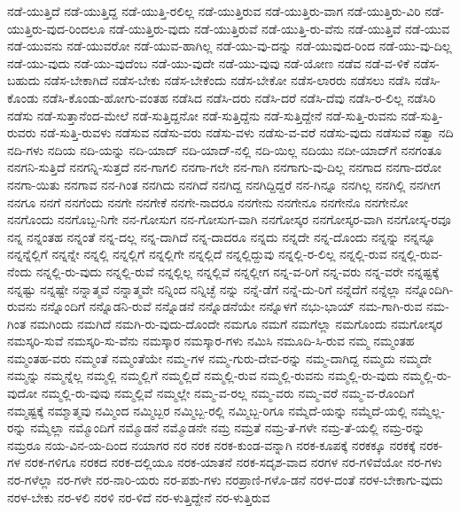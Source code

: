{ನಡೆ-ಯುತ್ತಿದೆ
ನಡೆ-ಯುತ್ತಿದ್ದ
ನಡೆ-ಯುತ್ತಿ-ರಲಿಲ್ಲ
ನಡೆ-ಯುತ್ತಿರುವ
ನಡೆ-ಯುತ್ತಿರು-ವಾಗ
ನಡೆ-ಯುತ್ತಿರು-ವಿರಿ
ನಡೆ-ಯುತ್ತಿರು-ವುದ-ರಿಂದಲೂ
ನಡೆ-ಯುತ್ತಿರು-ವುದು
ನಡೆ-ಯುತ್ತಿರುವೆ
ನಡೆ-ಯುತ್ತಿ-ರು-ವೆನು
ನಡೆ-ಯುತ್ತಿವೆ
ನಡೆ-ಯುವ
ನಡೆ-ಯುವನು
ನಡೆ-ಯುವರೋ
ನಡೆ-ಯುವ-ಹಾಗಿಲ್ಲ
ನಡೆ-ಯು-ವು-ದನ್ನು
ನಡೆ-ಯುವುದ-ರಿಂದ
ನಡೆ-ಯು-ವು-ದಿಲ್ಲ
ನಡೆ-ಯು-ವುದು
ನಡೆ-ಯು-ವುದೆಂಬ
ನಡೆ-ಯು-ವುದೇ
ನಡೆ-ಯು-ವುವು
ನಡೆ-ಯೋಣ
ನಡೆವ
ನಡೆ-ವ-ಳಿಕೆ
ನಡೆಸ-ಬಹುದು
ನಡೆಸ-ಬೇಕಾಗಿದೆ
ನಡೆಸ-ಬೇಕು
ನಡೆಸ-ಬೇಕೆಂದು
ನಡೆಸ-ಬೇಕೋ
ನಡೆಸ-ಲಾರರು
ನಡೆಸಲು
ನಡೆಸಿ
ನಡೆಸಿ-ಕೊಂಡು
ನಡೆಸಿ-ಕೊಂಡು-ಹೋಗು-ವಂತಹ
ನಡೆಸಿದ
ನಡೆಸಿ-ದರು
ನಡೆಸಿ-ದರೆ
ನಡೆಸಿ-ದೆವು
ನಡೆಸಿ-ರ-ಲಿಲ್ಲ
ನಡೆಸಿರಿ
ನಡೆಸು
ನಡೆ-ಸುತ್ತಾನೆಂದ-ಮೇಲೆ
ನಡೆ-ಸುತ್ತಿದ್ದನೋ
ನಡೆ-ಸುತ್ತಿದ್ದೆನು
ನಡೆ-ಸುತ್ತಿದ್ದೇನೆ
ನಡೆ-ಸುತ್ತಿ-ರುವನು
ನಡೆ-ಸುತ್ತಿ-ರುವರು
ನಡೆ-ಸುತ್ತಿ-ರುವಳು
ನಡೆಸುವ
ನಡೆಸು-ವರು
ನಡೆಸು-ವಳು
ನಡೆಸು-ವ-ವರೆ
ನಡೆಸು-ವುದು
ನಡೆಸುವೆ
ನತ್ವಾ
ನದಿ
ನದಿ-ಗಳು
ನದಿಯ
ನದಿ-ಯನ್ನು
ನದಿ-ಯಾದ್
ನದಿ-ಯಾದ್‌-ನಲ್ಲಿ
ನದಿ-ಯಿಲ್ಲ
ನದಿಯು
ನದೀ-ಯಾದ್‌ಗೆ
ನನಗಂತೂ
ನನಗನಿ-ಸುತ್ತಿದೆ
ನನಗನ್ನಿ-ಸುತ್ತದೆ
ನನ-ಗಾಗಲಿ
ನನಗಾ-ಗಲೇ
ನನ-ಗಾಗಿ
ನನಗಾಗು-ವು-ದಿಲ್ಲ
ನನಗಾದ
ನನಗಾ-ದರೋ
ನನಗಾ-ಯಿತು
ನನಗಾವ
ನನ-ಗಿಂತ
ನನಗಿದು
ನನಗಿದೆ
ನನಗಿದ್ದ
ನನಗಿದ್ದಿದ್ದರೆ
ನನ-ಗಿನ್ನೂ
ನನಗಿಲ್ಲ
ನನಗಿಲ್ಲಿ
ನನಗೀಗ
ನನಗೂ
ನನಗೆ
ನನಗೆಂದು
ನನಗೇ
ನನಗೇಕೆ
ನನಗೇ-ನಾದರೂ
ನನಗೇನು
ನನಗೇನೂ
ನನಗೇನೊ
ನನಗೇನೋ
ನನಗೊಂದು
ನನಗೊಬ್ಬ-ನಿಗೇ
ನನ-ಗೋಸುಗ
ನನ-ಗೋಸುಗ-ವಾಗಿ
ನನಗೋಸ್ಕರ
ನನಗೋಸ್ಕರ-ವಾಗಿ
ನನಗೋಸ್ಕ-ರವೂ
ನನ್ನ
ನನ್ನಂತಹ
ನನ್ನಂತೆ
ನನ್ನ-ದಲ್ಲ
ನನ್ನ-ದಾಗಿದೆ
ನನ್ನ-ದಾದರೂ
ನನ್ನದು
ನನ್ನದೇ
ನನ್ನ-ದೊಂದು
ನನ್ನನ್ನು
ನನ್ನನ್ನೂ
ನನ್ನನ್ನೆಲ್ಲಿಗೆ
ನನ್ನನ್ನೇ
ನನ್ನಲ್ಲಿ
ನನ್ನಲ್ಲಿಗೆ
ನನ್ನಲ್ಲಿಗೇ
ನನ್ನಲ್ಲಿದೆ
ನನ್ನಲ್ಲಿದ್ದುವು
ನನ್ನಲ್ಲಿ-ರ-ಲಿಲ್ಲ
ನನ್ನಲ್ಲಿ-ರುವ
ನನ್ನಲ್ಲಿ-ರುವ-ನೆಂದು
ನನ್ನಲ್ಲಿ-ರು-ವುದು
ನನ್ನಲ್ಲಿ-ರುವೆ
ನನ್ನಲ್ಲಿಲ್ಲ
ನನ್ನಲ್ಲಿವೆ
ನನ್ನಲ್ಲೀಗ
ನನ್ನ-ವ-ರಿಗೆ
ನನ್ನ-ವರು
ನನ್ನ-ವರೇ
ನನ್ನಷ್ಟಕ್ಕೆ
ನನ್ನಷ್ಟು
ನನ್ನಷ್ಟೇ
ನನ್ನಾತ್ಮವೆ
ನನ್ನಾತ್ಮವೇ
ನನ್ನಿಂದ
ನನ್ನಿಚ್ಛೆ
ನನ್ನು
ನನ್ನೆ-ಡೆಗೆ
ನನ್ನೆ-ದು-ರಿಗೆ
ನನ್ನೆದೆಗೆ
ನನ್ನೆಲ್ಲಾ
ನನ್ನೊಂದಿಗಿ-ರುವನು
ನನ್ನೊಂದಿಗೆ
ನನ್ನೊಡನಿ-ರುವೆ
ನನ್ನೊಡನೆ
ನನ್ನೊಡನೆಯೇ
ನನ್ನೊಳಗೆ
ನಭು-ಭಾಯ್
ನಮ-ಗಾಗಿ-ರುವ
ನಮ-ಗಿಂತ
ನಮಗಿಂದು
ನಮಗಿದೆ
ನಮಗಿ-ರು-ವುದು-ದೊಂದೇ
ನಮಗೂ
ನಮಗೆ
ನಮಗೆಲ್ಲಾ
ನಮಗೊಂದು
ನಮಗೋಸ್ಕರ
ನಮಸ್ಕರಿ-ಸುವೆ
ನಮಸ್ಕರಿ-ಸು-ವೆನು
ನಮಸ್ಕಾರ
ನಮಸ್ಕಾರ-ಗಳು
ನಮಿಸಿ
ನಮೂದಿ-ಸಿ-ರುವ
ನಮ್ಮ
ನಮ್ಮಂತಹ
ನಮ್ಮಂತಹ-ವರು
ನಮ್ಮಂತೆ
ನಮ್ಮಂತೆಯೇ
ನಮ್ಮ-ಗಳ
ನಮ್ಮ-ಗುರು-ದೇವ-ರನ್ನು
ನಮ್ಮ-ದಾಗಿದ್ದ
ನಮ್ಮದು
ನಮ್ಮದೇ
ನಮ್ಮನ್ನು
ನಮ್ಮನ್ನೆಲ್ಲ
ನಮ್ಮಲ್ಲಿ
ನಮ್ಮಲ್ಲಿಗೆ
ನಮ್ಮಲ್ಲಿದೆ
ನಮ್ಮಲ್ಲಿ-ರುವ
ನಮ್ಮಲ್ಲಿ-ರುವನು
ನಮ್ಮಲ್ಲಿ-ರು-ವುದು
ನಮ್ಮಲ್ಲಿ-ರು-ವುದೋ
ನಮ್ಮಲ್ಲಿ-ರು-ವುವು
ನಮ್ಮಲ್ಲಿವೆ
ನಮ್ಮಲ್ಲೇ
ನಮ್ಮ-ವ-ರಲ್ಲ
ನಮ್ಮ-ವರು
ನಮ್ಮ-ವರೆ
ನಮ್ಮ-ವ-ರೊಂದಿಗೆ
ನಮ್ಮಷ್ಟಕ್ಕೆ
ನಮ್ಮಾತ್ಮವು
ನಮ್ಮಿಂದ
ನಮ್ಮಿಬ್ಬರ
ನಮ್ಮಿಬ್ಬ-ರಲ್ಲಿ
ನಮ್ಮಿಬ್ಬ-ರಿಗೂ
ನಮ್ಮೆದೆ-ಯನ್ನು
ನಮ್ಮೆದೆ-ಯಲ್ಲಿ
ನಮ್ಮೆಲ್ಲ-ರನ್ನು
ನಮ್ಮೆಲ್ಲಾ
ನಮ್ಮೊಂದಿಗೆ
ನಮ್ಮೊಡನೆ
ನಮ್ಮೊಡನೇ
ನಮ್ರ
ನಮ್ರತೆ
ನಮ್ರ-ತೆ-ಗಳೇ
ನಮ್ರ-ತೆ-ಯಲ್ಲಿ
ನಮ್ರ-ರನ್ನು
ನಮ್ರರೂ
ನಯ-ವಿನ-ಯ-ದಿಂದ
ನಯಾಗರ
ನರ
ನರಕ
ನರಕ-ಕುಂಡ-ವನ್ನಾಗಿ
ನರಕ-ಕೂಪಕ್ಕೆ
ನರಕಕ್ಕೂ
ನರಕಕ್ಕೆ
ನರಕ-ಗಳ
ನರಕ-ಗಳಿಗೂ
ನರಕದ
ನರಕ-ದಲ್ಲಿಯೂ
ನರಕ-ಯಾತನೆ
ನರಕ-ಸದೃಶ-ವಾದ
ನರಗಳ
ನರ-ಗಳಿವೆಯೋ
ನರ-ಗಳು
ನರ-ಗಳೆಲ್ಲಾ
ನರ-ಗಳೇ
ನರ-ನಾರಿ-ಯರು
ನರ-ಪಶು-ಗಳು
ನರಪ್ರಾಣಿ-ಗಳೊ-ಡನೆ
ನರಳ-ದಂತೆ
ನರಳ-ಬೇಕಾಗು-ವುದು
ನರಳ-ಬೇಕು
ನರ-ಳಲಿ
ನರಳಿ
ನರ-ಳಿದೆ
ನರ-ಳುತ್ತಿದ್ದೇನೆ
ನರ-ಳುತ್ತಿರುವ
}
